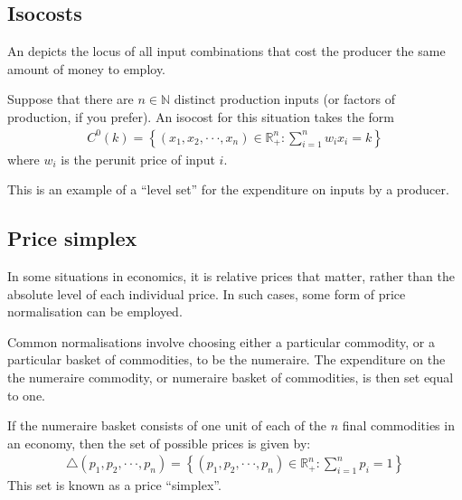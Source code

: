 \documentclass[letterpaper,10pt,english]{jupyterBook}
\begin{document}
\subsection{Isocosts}
\label{\detokenize{02.sets_numbers_coordinates_distances:isocosts}}
\sphinxAtStartPar
An  depicts the locus of all input combinations that cost the producer the same amount of money to employ.

\sphinxAtStartPar
Suppose that there are \(n \in \mathbb{N}\) distinct production inputs (or factors of
production, if you prefer). An isocost for this situation takes the form
\begin{equation*}
\begin{split}C^0(k) = \left\{(x_1, x_2, · · · , x_n) \in \mathbb{R}^n_+ :
\sum_{i = 1}^{n} w_i x_i = k
\right\}\end{split}
\end{equation*}
\sphinxAtStartPar
where \(w_i\) is the per\sphinxhyphen{}unit price of input \(i\).

\sphinxAtStartPar
This is an example of a “level set” for the expenditure on inputs by a producer.


\subsection{Price simplex}
\label{\detokenize{02.sets_numbers_coordinates_distances:price-simplex}}
\sphinxAtStartPar
In some situations in economics, it is relative prices that matter, rather than the absolute level of each individual price. In such cases, some form of price normalisation can be employed.

\sphinxAtStartPar
Common normalisations involve choosing either a particular commodity, or a particular basket of commodities, to be the numeraire. The expenditure on the the numeraire commodity, or numeraire basket of commodities, is then set equal to one.

\sphinxAtStartPar
If the numeraire basket consists of one unit of each of the \(n\) final commodities in an economy, then the set of possible prices is given by:
\begin{equation*}
\begin{split}\bigtriangleup (p_1, p_2, · · · , p_n) =
\left\{ (p_1, p_2, · · · , p_n) \in \mathbb{R}^n_+ :
\sum_{i = 1}^{n} p_i = 1
\right\}\end{split}
\end{equation*}
\sphinxAtStartPar
This set is known as a price “simplex”.
\end{document}
